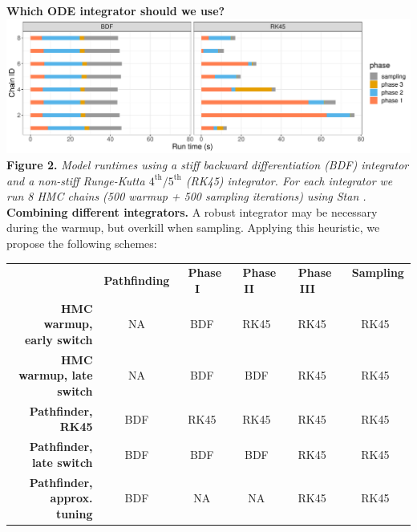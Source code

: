 \documentclass[21pt, custom, portrait, plainboxedsections]{sciposter}
\begin{document}
\begin{multicols}{3}
\textbf{Which ODE integrator should we use?} \\

\includegraphics[width = 14.5in]{../figures/phase_time_facet_4x12.pdf}
\textbf{Figure 2.} \textit{Model runtimes using a stiff backward differentiation (BDF) integrator and a non-stiff Runge-Kutta $4^\text{th}/5^\text{th}$ (RK45) integrator.
For each integrator we run 8 HMC chains (500 warmup + 500 sampling iterations) using Stan \cite{Stan:2021}.} \\


\textbf{Combining different integrators.} A robust integrator may be necessary during the warmup, but overkill when sampling.
Applying this heuristic, we propose the following schemes:

\begin{center}
\renewcommand{\arraystretch}{1.5}
\begin{tabular}{r c c c c c}
  & \textbf{Pathfinding} & \ \textbf{Phase I} \ & \ \textbf{Phase II} \ \ & \ \textbf{Phase III} \ & \ \textbf{Sampling} \ \\
  \textbf{HMC warmup, early switch} & NA & \cellcolor{Melon} BDF & \cellcolor{SkyBlue} RK45 & \cellcolor{SkyBlue} RK45 & \cellcolor{SkyBlue} RK45 \\
  \textbf{HMC warmup, late switch} & NA & \cellcolor{Melon} BDF & \cellcolor{Melon} BDF &  \cellcolor{SkyBlue} RK45 & \cellcolor{SkyBlue} RK45 \\
  \hline
  \textbf{Pathfinder, RK45} & \cellcolor{Melon} BDF  & \cellcolor{SkyBlue} RK45 & \cellcolor{SkyBlue} RK45 & \cellcolor{SkyBlue} RK45 & \cellcolor{SkyBlue} RK45 \\
  \textbf{Pathfinder, late switch} & \cellcolor{Melon} BDF & \cellcolor{Melon} BDF & \cellcolor{Melon} BDF & \cellcolor{SkyBlue} RK45 & \cellcolor{SkyBlue} RK45 \\
  \textbf{Pathfinder, approx. tuning} & \cellcolor{Melon} BDF & NA & NA & \cellcolor{SkyBlue} RK45 & \cellcolor{SkyBlue} RK45
\end{tabular}
\end{center}


\end{multicols}
\end{document}
